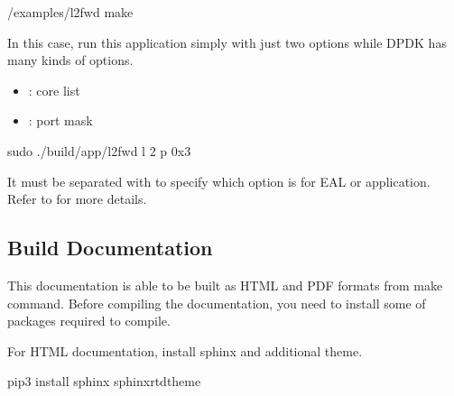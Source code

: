 \documentclass[a4paper,11pt,openany,oneside,english]{sphinxmanual}
\begin{document}
\begin{sphinxVerbatim}[commandchars=\\\{\},formatcom=\footnotesize]
  /examples/l2fwd
 make
\end{sphinxVerbatim}

In this case, run this application simply with just two options
while DPDK has many kinds of options.
\begin{itemize}
\item {} 
: core list

\item {} 
: port mask

\end{itemize}

\begin{sphinxVerbatim}[commandchars=\\\{\},formatcom=\footnotesize]
 sudo ./build/app/l2fwd 
  \PYGZhy{}l \PYGZhy{}2 
  \PYGZhy{}\PYGZhy{} \PYGZhy{}p 0x3
\end{sphinxVerbatim}

It must be separated with \sphinxcode{\sphinxupquote{-{-}}} to specify which option is
for EAL or application.
Refer to 
for more details.


\subsection{Build Documentation}
\label{\detokenize{gsg/install:build-documentation}}
This documentation is able to be built as HTML and PDF formats from make
command. Before compiling the documentation, you need to install some of
packages required to compile.

For HTML documentation, install sphinx and additional theme.

\begin{sphinxVerbatim}[commandchars=\\\{\},formatcom=\footnotesize]
 pip3 install sphinx 
  sphinx\PYGZhy{}rtd\PYGZhy{}theme
\end{sphinxVerbatim}
\end{document}
